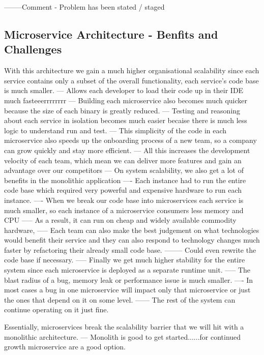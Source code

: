 \documentclass[a4paper, 11pt]{book}
\begin{document}
    --------Comment - Problem has been stated / staged

    \subsection{Microservice Architecture - Benfits and Challenges}
    With this architecture we gain a much higher organisational scalability since each service contains only a subset of the overall functionality, each service's code base is much smaller.
    --- Allows each developer to load their code up in their IDE much fasteeerrrrrrrr
    --- Building each microservice also becomes much quicker because the size of each binary is greatly reduced.
    --- Testing and reasoning about each service in isolation becomes much easier becaise there is much less logic to understand run and test.
    --- This simplicity of the code in each microservice also speeds up the onboarding process of a new team, so a company can grow quickly and stay more efficient.
    --- All this increases the development velocity of each team, which mean we can deliver more features and gain an advantage over our competitors
    --- On system scalability, we also get a lot of benefits in the monolithic application
    ---- Each instance had to run the entire code base which required very powerful and expensive hardware to run each instance.
    ---- When we break our code base into microservices each service is much smaller, so each instance of a microservice consumers less memory and CPU
    ----- As a result, it can run on cheap and widely available commodity hardware,
    ----- Each team can also make the best judgement on what technologies would benefit their service and they can also respond to technology changes much faster by refactoring their already small code base.
    -------- Could even rewrite the code base if necessary.
    ----- Finally we get much higher stability for the entire system since each microservice is deployed as a separate runtime unit.
    ----- The blast radius of a bug, memory leak or performance issue is much smaller.
    ---- In most cases a bug in one microservice will impact only that microservice or just the ones that depend on it on some level.
    ------ The rest of the system can continue operating on it just fine.

    Essentially, microservices break the scalability barrier that we will hit with a monolithic architecture.
    --- Monolith is good to get started......for continued growth microservice are a good option.
\end{document}
